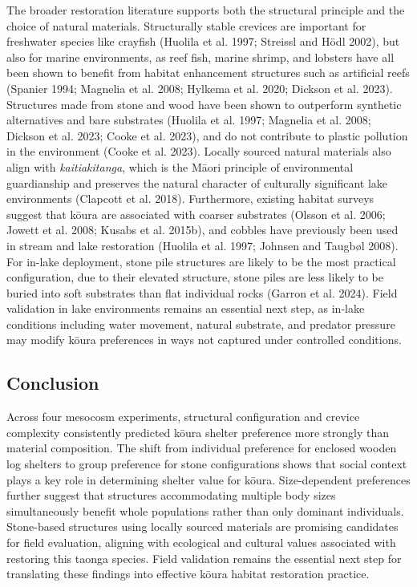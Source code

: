 \documentclass[
  12pt,
  a4paper,
  oneside]{scrbook}
\begin{document}
The broader restoration literature supports both the structural
principle and the choice of natural materials. Structurally stable
crevices are important for freshwater species like crayfish (Huolila et
al. 1997; Streissl and Hödl 2002), but also for marine environments, as
reef fish, marine shrimp, and lobsters have all been shown to benefit
from habitat enhancement structures such as artificial reefs (Spanier
1994; Magnelia et al. 2008; Hylkema et al. 2020; Dickson et al. 2023).
Structures made from stone and wood have been shown to outperform
synthetic alternatives and bare substrates (Huolila et al. 1997;
Magnelia et al. 2008; Dickson et al. 2023; Cooke et al. 2023), and do
not contribute to plastic pollution in the environment (Cooke et al.
2023). Locally sourced natural materials also align with
\emph{kaitiakitanga}, which is the Māori principle of environmental
guardianship and preserves the natural character of culturally
significant lake environments (Clapcott et al. 2018). Furthermore,
existing habitat surveys suggest that kōura are associated with coarser
substrates (Olsson et al. 2006; Jowett et al. 2008; Kusabs et al.
2015b), and cobbles have previously been used in stream and lake
restoration (Huolila et al. 1997; Johnsen and Taugbøl 2008). For in-lake
deployment, stone pile structures are likely to be the most practical
configuration, due to their elevated structure, stone piles are less
likely to be buried into soft substrates than flat individual rocks
(Garron et al. 2024). Field validation in lake environments remains an
essential next step, as in-lake conditions including water movement,
natural substrate, and predator pressure may modify kōura preferences in
ways not captured under controlled conditions.

\subsection{Conclusion}\label{conclusion}

Across four mesocosm experiments, structural configuration and crevice
complexity consistently predicted kōura shelter preference more strongly
than material composition. The shift from individual preference for
enclosed wooden log shelters to group preference for stone
configurations shows that social context plays a key role in determining
shelter value for kōura. Size-dependent preferences further suggest that
structures accommodating multiple body sizes simultaneously benefit
whole populations rather than only dominant individuals. Stone-based
structures using locally sourced materials are promising candidates for
field evaluation, aligning with ecological and cultural values
associated with restoring this taonga species. Field validation remains
the essential next step for translating these findings into effective
kōura habitat restoration practice.
\end{document}
